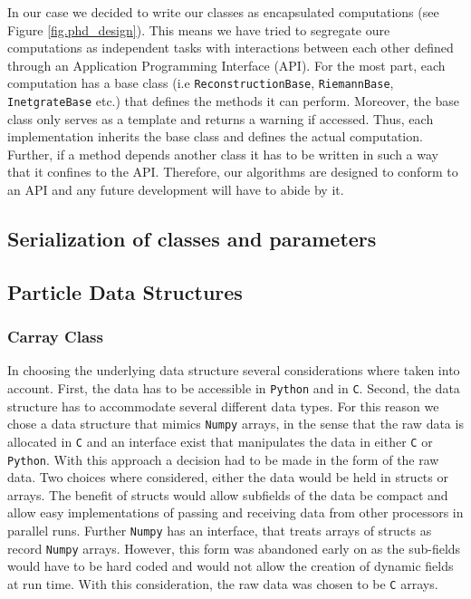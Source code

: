 In our case we decided to write our classes as encapsulated computations (see Figure 
\ref{fig.phd_design}). This means we have
tried to segregate oure computations as independent tasks with interactions between each other
defined through an Application Programming Interface (API). For the most part, each computation
has a base class (i.e \lstinline{ReconstructionBase}, \lstinline{RiemannBase}, 
\lstinline{InetgrateBase} etc.) that
defines the methods it can perform. Moreover, the base class only serves as a template and
returns a warning if accessed. Thus, each implementation inherits the base class and defines
the actual computation. Further, if a method depends another class it has to be written in
such a way that it confines to the API. Therefore, our algorithms are designed to conform to an API
and any future development will have to abide by it.

\subsection{Serialization of classes and parameters}
\subsection{Particle Data Structures}
\subsubsection{Carray Class}
In choosing the underlying data structure several considerations where taken into account. First, the
data has to be accessible in \texttt{Python} and in \texttt{C}. Second, the data structure has to
accommodate several different data types. For this reason we chose a data structure that mimics
\texttt{Numpy} arrays, in the sense that the raw data is allocated in \texttt{C} and an interface exist that
manipulates the data in either \texttt{C} or \texttt{Python}. With this approach a decision had to be
made in the form of the raw data. Two choices where considered, either the data would
be held in structs or arrays. The benefit of structs would allow subfields of the data
be compact and allow easy implementations of passing and receiving data from other
processors in parallel runs. Further \texttt{Numpy} has an interface, that treats
arrays of structs as record \texttt{Numpy} arrays. However, this form was abandoned early on
as the sub-fields would have to be hard coded and would not allow the creation of
dynamic fields at run time. With this consideration, the raw data was chosen to be
\texttt{C} arrays. 

